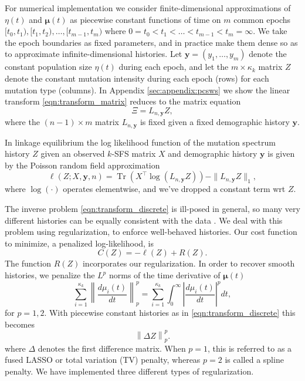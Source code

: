 \documentclass[11pt]{article}
\DeclareMathOperator{\Tr}{Tr}
\begin{document}
For numerical implementation we consider finite-dimensional approximations of $\eta(t)$ and $\boldsymbol\mu(t)$ as piecewise constant functions of time on $m$ common epochs $[t_0, t_1), [t_1, t_2),\dots, [t_{m-1}, t_m)$ where $0=t_0 < t_1 < \dots < t_{m-1} < t_m=\infty$.
We take the epoch boundaries as fixed parameters, and in practice make them dense so as to approximate infinite-dimensional histories.
Let $\boldsymbol y = (y_1,\dots,y_m)$ denote the constant population size $\eta(t)$ during each epoch, and let the $m\times\kappa_k$ matrix $Z$ denote the constant mutation intensity during each epoch (rows) for each mutation type (columns).
In Appendix \ref{sec:appendix:pcsws} we show the linear transform \eqref{eqn:transform_matrix} reduces to the matrix equation
\begin{equation}
\label{eqn:transform_discrete}
\Xi = L_{n, \boldsymbol y} Z,
\end{equation}
where the $(n-1)\times m$ matrix $L_{n, \boldsymbol y}$ is fixed given a fixed demographic history $\boldsymbol y$.

In linkage equilibrium the log likelihood function of the mutation spectrum history $Z$ given an observed $k$-SFS matrix $X$ and demographic history $\boldsymbol y$ is given by the Poisson random field approximation \cite{?}
\[
\ell(Z; X, \boldsymbol y, n) = \Tr(X^\intercal\log(L_{n, \boldsymbol y} Z)) - \|L_{n, \boldsymbol y} Z\|_1,
\]
where $\log(\cdot)$ operates elementwise, and we've dropped a constant term wrt $Z$.

The inverse problem \eqref{eqn:transform_discrete} is ill-posed in general,
so many very different histories can be equally consistent with the data
\cite{oscillation paper? Yun's other papers?}.
We deal with this problem using regularization, to enforce well-behaved histories.
Our cost function to minimize, a penalized log-likelihood, is
\begin{equation}
\label{eqn:penalized}
C(Z)
= -\ell(Z) + R(Z) .
\end{equation}
The function $R(Z)$ incorporates our regularization.
In order to recover smooth histories,
we penalize the $L^p$ norms
of the time derivative of $\boldsymbol\mu(t)$
\[
\sum_{i=1}^{\kappa_k}\left\| \frac{d \mu_i(t)}{d t} \right\|_p^p
= \sum_{i=1}^{\kappa_k}\int_0^\infty\left|\frac{d\mu_i(t)}{dt}\right|^p dt,
\]
for $p=1,2$.
With piecewise constant histories as in \eqref{eqn:transform_discrete} this becomes
\[
\left\|\Delta Z \right\|_p^p.
\]
where $\Delta$ denotes the first difference matrix.
When $p = 1$, this is referred to as a fused LASSO or total variation (TV) penalty,
whereas $p=2$ is called a spline penalty.
We have implemented three different types of regularization.
\end{document}
